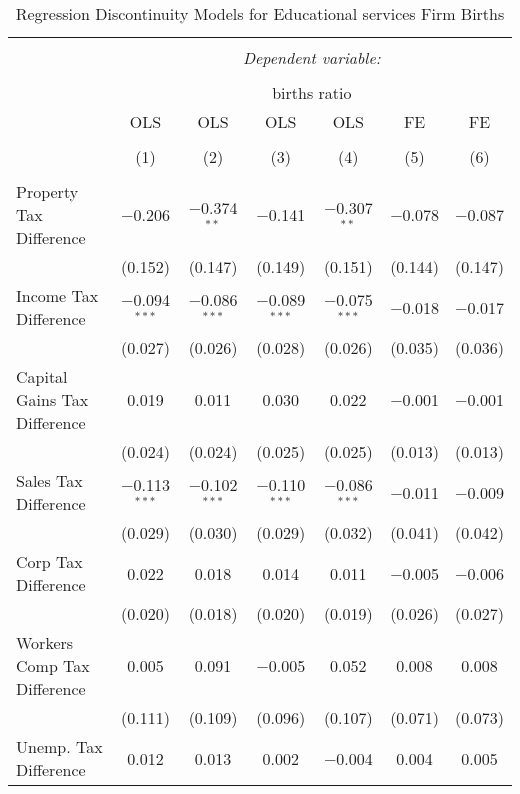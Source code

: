 
\begin{table}[!htbp] \centering 
  \caption{Regression Discontinuity Models for  Educational services Firm Births} 
  \label{61rd} 
\footnotesize 
\begin{tabular}{@{\extracolsep{5pt}}lcccccc} 
\\[-1.8ex]\hline 
\hline \\[-1.8ex] 
 & \multicolumn{6}{c}{\textit{Dependent variable:}} \\ 
\cline{2-7} 
\\[-1.8ex] & \multicolumn{6}{c}{births ratio} \\ 
 & OLS & OLS & OLS & OLS & FE & FE \\ 
\\[-1.8ex] & (1) & (2) & (3) & (4) & (5) & (6)\\ 
\hline \\[-1.8ex] 
 Property Tax Difference & $-$0.206 & $-$0.374$^{**}$ & $-$0.141 & $-$0.307$^{**}$ & $-$0.078 & $-$0.087 \\ 
  & (0.152) & (0.147) & (0.149) & (0.151) & (0.144) & (0.147) \\ 
  Income Tax Difference & $-$0.094$^{***}$ & $-$0.086$^{***}$ & $-$0.089$^{***}$ & $-$0.075$^{***}$ & $-$0.018 & $-$0.017 \\ 
  & (0.027) & (0.026) & (0.028) & (0.026) & (0.035) & (0.036) \\ 
  Capital Gains Tax Difference & 0.019 & 0.011 & 0.030 & 0.022 & $-$0.001 & $-$0.001 \\ 
  & (0.024) & (0.024) & (0.025) & (0.025) & (0.013) & (0.013) \\ 
  Sales Tax Difference & $-$0.113$^{***}$ & $-$0.102$^{***}$ & $-$0.110$^{***}$ & $-$0.086$^{***}$ & $-$0.011 & $-$0.009 \\ 
  & (0.029) & (0.030) & (0.029) & (0.032) & (0.041) & (0.042) \\ 
  Corp Tax Difference & 0.022 & 0.018 & 0.014 & 0.011 & $-$0.005 & $-$0.006 \\ 
  & (0.020) & (0.018) & (0.020) & (0.019) & (0.026) & (0.027) \\ 
  Workers Comp Tax Difference & 0.005 & 0.091 & $-$0.005 & 0.052 & 0.008 & 0.008 \\ 
  & (0.111) & (0.109) & (0.096) & (0.107) & (0.071) & (0.073) \\ 
  Unemp. Tax Difference & 0.012 & 0.013 & 0.002 & $-$0.004 & 0.004 & 0.005 \\ 

\end{tabular}
\end{table}
